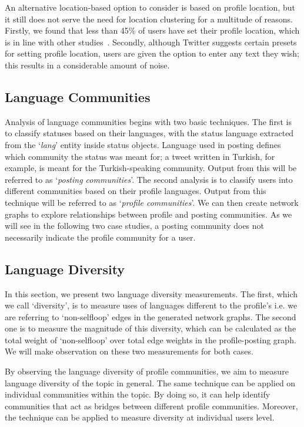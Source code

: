 An alternative location-based option to consider is based on profile
location, but it still does not serve the need for location clustering
for a multitude of reasons. Firstly, we found that less than 45\% of
users have set their profile location, which is in line with other
studies~\cite{graham-et-al:2014}. Secondly, although Twitter suggests
certain presets for setting profile location, users are given the
option to enter any text they wish; this results in a considerable
amount of noise.

\subsection{Language Communities}\label{langcomm}

Analysis of language communities begins with two basic techniques. The
first is to classify statuses based on their languages, with the
status language extracted from the `{\emph{lang}}' entity inside
status objects. Language used in posting defines which community the
status was meant for; a tweet written in Turkish, for example, is
meant for the Turkish-speaking community. Output from this will be
referred to as `{\emph{posting communities}}'. The second analysis is
to classify users into different communities based on their profile
languages. Output from this technique will be referred to as
`{\emph{profile communities}}'. We can then create network graphs to
explore relationships between profile and posting communities.  As we
will see in the following two case studies, a posting community does
not necessarily indicate the profile community for a user.

\subsection{Language Diversity}\label{diversity}

In this section, we present two language diversity measurements. The
first, which we call `diversity', is to measure uses of languages
different to the profile's i.e. we are referring to `non-selfloop'
edges in the generated network graphs. The second one is to measure
the magnitude of this diversity, which can be calculated as the total
weight of `non-selfloop' over total edge weights in the
profile-posting graph. We will make observation on these two
measurements for both cases.

By observing the language diversity of profile communities, we aim to
measure language diversity of the topic in general. The same technique
can be applied on individual communities within the topic. By doing
so, it can help identify communities that act as bridges between
different profile communities. Moreover, the technique can be applied
to measure diversity at individual users level.


